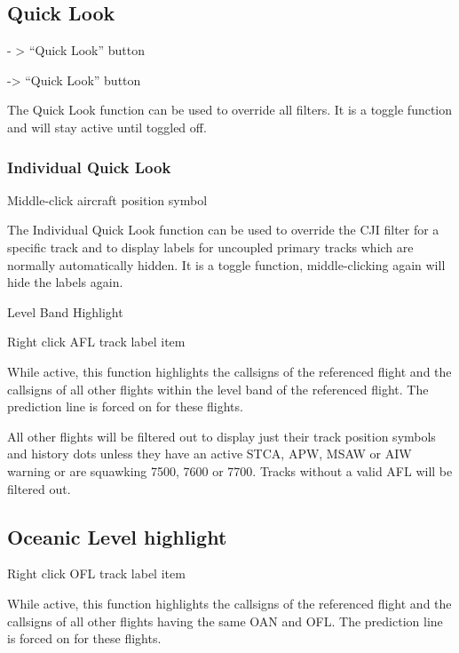\documentclass[a4paper,oneside,11pt]{memoir}
\begin{document}
\subsection{Quick Look}
\label{win:qlook}

 - > “Quick Look” button

 -> “Quick Look” button 


\bigskip

The Quick Look function can be used to override all filters. It is a toggle function and will stay active until toggled off.

\subsubsection{Individual Quick Look}

Middle-click aircraft position symbol

\bigskip

The Individual Quick Look function can be used to override the CJI filter for a specific track and to display labels for uncoupled primary tracks which are normally automatically hidden. It is a toggle function, middle-clicking again will hide the labels again.

{Level Band Highlight}\label{func:lbh}

Right click AFL track label item 

\bigskip

While active, this function highlights the callsigns of the referenced flight and the callsigns of all other flights within the level band of the referenced flight. The prediction line is forced on for these flights.

\bigskip

All other flights will be filtered out to display just their track position symbols and history dots unless they have an active STCA, APW, MSAW or AIW warning or are squawking 7500, 7600 or 7700. Tracks without a valid AFL will be filtered out.

\subsection{Oceanic Level highlight}\label{func:olh}

Right click OFL track label item 

\bigskip

While active, this function highlights the callsigns of the referenced flight and the callsigns of all other flights having the same OAN and OFL. The prediction line is forced on for these flights.
\end{document}
